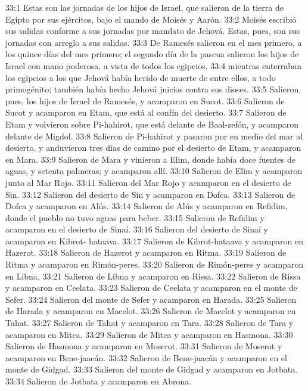 33:1 Estas son las jornadas de los hijos de Israel, que salieron de la tierra de Egipto por sus ejércitos, bajo el mando de Moisés y Aarón.  
33:2 Moisés escribió sus salidas conforme a sus jornadas por mandato de Jehová. Estas, pues, son sus jornadas con arreglo a sus salidas.  
33:3 De Ramesés salieron en el mes primero, a los quince días del mes primero; el segundo día de la pascua salieron los hijos de Israel con mano poderosa, a vista de todos los egipcios,  
33:4 mientras enterraban los egipcios a los que Jehová había herido de muerte de entre ellos, a todo primogénito; también había hecho Jehová juicios contra sus dioses.  
33:5 Salieron, pues, los hijos de Israel de Ramesés, y acamparon en Sucot.  
33:6 Salieron de Sucot y acamparon en Etam, que está al confín del desierto.  
33:7 Salieron de Etam y volvieron sobre Pi-hahirot, que está delante de Baal-zefón, y acamparon delante de Migdol.  
33:8 Salieron de Pi-hahirot y pasaron por en medio del mar al desierto, y anduvieron tres días de camino por el desierto de Etam, y acamparon en Mara.  
33:9 Salieron de Mara y vinieron a Elim, donde había doce fuentes de aguas, y setenta palmeras; y acamparon allí.  
33:10 Salieron de Elim y acamparon junto al Mar Rojo.  
33:11 Salieron del Mar Rojo y acamparon en el desierto de Sin.  
33:12 Salieron del desierto de Sin y acamparon en Dofca.  
33:13 Salieron de Dofca y acamparon en Alús.  
33:14 Salieron de Alús y acamparon en Refidim, donde el pueblo no tuvo aguas para beber.  
33:15 Salieron de Refidim y acamparon en el desierto de Sinaí.  
33:16 Salieron del desierto de Sinaí y acamparon en Kibrot- hataava.  
33:17 Salieron de Kibrot-hataava y acamparon en Hazerot.  
33:18 Salieron de Hazerot y acamparon en Ritma.  
33:19 Salieron de Ritma y acamparon en Rimón-peres.  
33:20 Salieron de Rimón-peres y acamparon en Libna.  
33:21 Salieron de Libna y acamparon en Rissa.  
33:22 Salieron de Rissa y acamparon en Ceelata.  
33:23 Salieron de Ceelata y acamparon en el monte de Sefer.  
33:24 Salieron del monte de Sefer y acamparon en Harada.  
33:25 Salieron de Harada y acamparon en Macelot.  
33:26 Salieron de Macelot y acamparon en Tahat.  
33:27 Salieron de Tahat y acamparon en Tara.  
33:28 Salieron de Tara y acamparon en Mitca.  
33:29 Salieron de Mitca y acamparon en Hasmona.  
33:30 Salieron de Hasmona y acamparon en Moserot.  
33:31 Salieron de Moserot y acamparon en Bene-jaacán.  
33:32 Salieron de Bene-jaacán y acamparon en el monte de Gidgad.  
33:33 Salieron del monte de Gidgad y acamparon en Jotbata.  
33:34 Salieron de Jotbata y acamparon en Abrona.  
